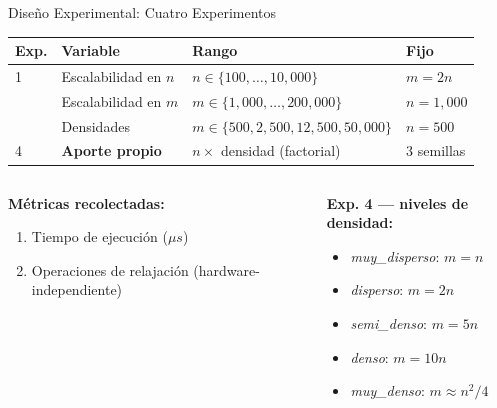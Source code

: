\documentclass[aspectratio=169,12pt]{beamer}
\begin{document}
\begin{frame}{Diseño Experimental: Cuatro Experimentos}
  \begin{center}
  {\scriptsize
  \begin{tabular}{C{1.8cm}C{3.2cm}C{3.2cm}C{2.2cm}}
    \toprule
    \textbf{Exp.} & \textbf{Variable} & \textbf{Rango} & \textbf{Fijo}\\
     & Escalabilidad en $n$ & $n\in\{100,\ldots,10{,}000\}$ & $m=2n$\\
     & Escalabilidad en $m$ & $m\in\{1{,}000,\ldots,200{,}000\}$ & $n=1{,}000$\\
     & Densidades & $m\in\{500,2{,}500,12{,}500,50{,}000\}$ & $n=500$\\
    \addlinespace[3pt]
    4 & \textbf{Aporte propio} & $n\times$ densidad (factorial) & 3 semillas\\
    \bottomrule
  \end{tabular}
  }
  \end{center}
  \vspace{0.15cm}
  \begin{columns}[T]
    \begin{column}{0.48\textwidth}
      {\footnotesize\textbf{Métricas recolectadas:}}
      \begin{enumerate}\scriptsize
        \item Tiempo de ejecución ($\mu s$)
        \item Operaciones de relajación (hardware-independiente)
      \end{enumerate}
    \end{column}
    \begin{column}{0.48\textwidth}
      {\footnotesize\textbf{Exp. 4 — niveles de densidad:}}
      \begin{itemize}\scriptsize
        \item \textit{muy\_disperso}: $m=n$
        \item \textit{disperso}: $m=2n$
        \item \textit{semi\_denso}: $m=5n$
        \item \textit{denso}: $m=10n$
        \item \textit{muy\_denso}: $m\approx n^2/4$
      \end{itemize}
    \end{column}
  \end{columns}
\end{frame}
\end{document}
